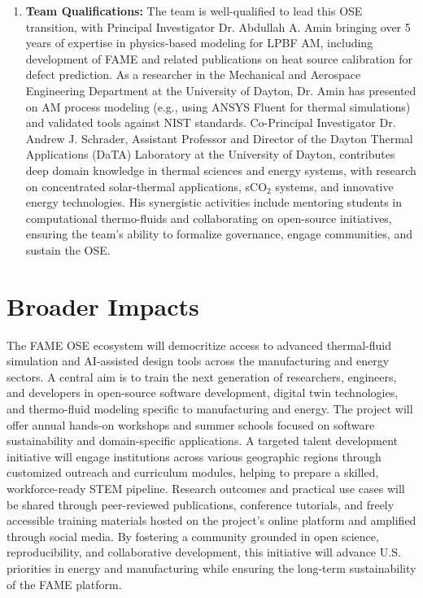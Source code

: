 \documentclass[11pt]{article}
\begin{document}
\begin{enumerate}
    \item \textbf{Team Qualifications:} The team is well-qualified to lead this OSE transition, with Principal Investigator Dr. Abdullah A. Amin bringing over 5 years of expertise in physics-based modeling for LPBF AM, including development of FAME and related publications on heat source calibration for defect prediction. As a researcher in the Mechanical and Aerospace Engineering Department at the University of Dayton, Dr. Amin has presented on AM process modeling (e.g., using ANSYS Fluent for thermal simulations) and validated tools against NIST standards. Co-Principal Investigator Dr. Andrew J. Schrader, Assistant Professor and Director of the Dayton Thermal Applications (DaTA) Laboratory at the University of Dayton, contributes deep domain knowledge in thermal sciences and energy systems, with research on concentrated solar-thermal applications, sCO$_2$ systems, and innovative energy technologies. His synergistic activities include mentoring students in computational thermo-fluids and collaborating on open-source initiatives, ensuring the team's ability to formalize governance, engage communities, and sustain the OSE.
\end{enumerate}

\section*{Broader Impacts}
\vspace{-3pt}
\noindent
The FAME OSE ecosystem will democritize access to advanced thermal-fluid simulation and AI-assisted design tools across the manufacturing and energy sectors. A central aim is to train the next generation of researchers, engineers, and developers in open-source software development, digital twin technologies, and thermo-fluid modeling specific to manufacturing and energy. The project will offer annual hands-on workshops and summer schools focused on software sustainability and domain-specific applications. A targeted talent development initiative will engage institutions across various geographic regions through customized outreach and curriculum modules, helping to prepare a skilled, workforce-ready STEM pipeline. Research outcomes and practical use cases will be shared through peer-reviewed publications, conference tutorials, and freely accessible training materials hosted on the project's online platform and amplified through social media. By fostering a community grounded in open science, reproducibility, and collaborative development, this initiative will advance U.S. priorities in energy and manufacturing while ensuring the long-term sustainability of the FAME platform.
\end{document}
